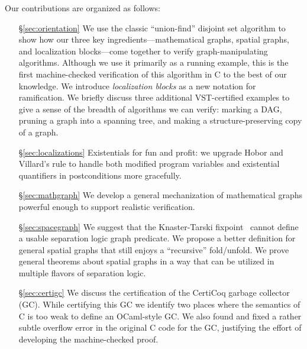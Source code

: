 Our contributions are organized as follows:
\begin{itemize}
\item[\S\ref{sec:orientation}] We use the classic ``union-find'' disjoint set algorithm to show how our three key ingredients---mathematical graphs, spatial graphs, and localization blocks---come together to verify 
graph-manipulating algorithms.
Although we use it primarily as a running example, {\color{magenta}this is the first machine-checked verification of this algorithm in C to the best of our knowledge.} 
We introduce \emph{localization blocks} as a new notation for ramification. We briefly discuss three additional VST-certified examples to give a sense of the breadth of algorithms we can verify: marking a DAG, pruning a graph into a spanning tree, and making a structure-preserving copy of a graph.
\item[\S\ref{sec:localizations}] Existentials for fun and profit: we upgrade Hobor and Villard's  rule to handle both modified program variables and existential quantifiers in postconditions more gracefully.
\item[\S\ref{sec:mathgraph}] {\color{magenta}We develop a general mechanization of mathematical graphs powerful enough to support realistic verification.}
\item[\S\ref{sec:spacegraph}] We suggest that the Knaster-Tarski fixpoint~\cite{tarski:fixpoint} cannot define a usable separation logic graph predicate.  We propose a better definition for general spatial graphs that still enjoys a ``recursive'' fold/unfold.  We prove general theorems about spatial graphs in a way that can be utilized in multiple flavors of separation logic. %
\item[\S\ref{sec:certigc}] We discuss the certification of the CertiCoq garbage collector (GC). While certifying this GC we identify two places where the semantics of C is too weak to define an OCaml-style GC. We also found and fixed a rather subtle overflow error in the original C code for the GC, justifying the effort of developing the machine-checked proof.

\end{itemize}
